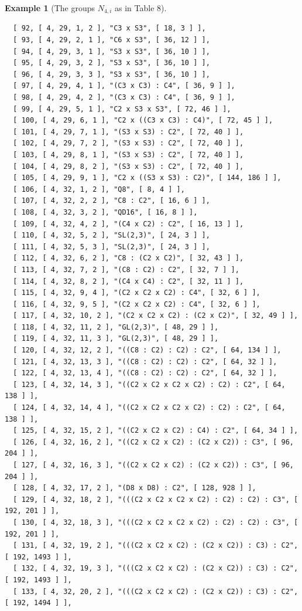 \documentclass{amsart}
\theoremstyle{plain}
\theoremstyle{definition}
\newtheorem{example}[theorem]{Example}
\theoremstyle{remark}
\begin{document}
\begin{example}[The groups $N_{4,i}$ as in Table $8$]
\begin{verbatim}
  [ 92, [ 4, 29, 1, 2 ], "C3 x S3", [ 18, 3 ] ], 
  [ 93, [ 4, 29, 2, 1 ], "C6 x S3", [ 36, 12 ] ], 
  [ 94, [ 4, 29, 3, 1 ], "S3 x S3", [ 36, 10 ] ], 
  [ 95, [ 4, 29, 3, 2 ], "S3 x S3", [ 36, 10 ] ], 
  [ 96, [ 4, 29, 3, 3 ], "S3 x S3", [ 36, 10 ] ], 
  [ 97, [ 4, 29, 4, 1 ], "(C3 x C3) : C4", [ 36, 9 ] ], 
  [ 98, [ 4, 29, 4, 2 ], "(C3 x C3) : C4", [ 36, 9 ] ], 
  [ 99, [ 4, 29, 5, 1 ], "C2 x S3 x S3", [ 72, 46 ] ], 
  [ 100, [ 4, 29, 6, 1 ], "C2 x ((C3 x C3) : C4)", [ 72, 45 ] ], 
  [ 101, [ 4, 29, 7, 1 ], "(S3 x S3) : C2", [ 72, 40 ] ], 
  [ 102, [ 4, 29, 7, 2 ], "(S3 x S3) : C2", [ 72, 40 ] ], 
  [ 103, [ 4, 29, 8, 1 ], "(S3 x S3) : C2", [ 72, 40 ] ], 
  [ 104, [ 4, 29, 8, 2 ], "(S3 x S3) : C2", [ 72, 40 ] ], 
  [ 105, [ 4, 29, 9, 1 ], "C2 x ((S3 x S3) : C2)", [ 144, 186 ] ], 
  [ 106, [ 4, 32, 1, 2 ], "Q8", [ 8, 4 ] ], 
  [ 107, [ 4, 32, 2, 2 ], "C8 : C2", [ 16, 6 ] ], 
  [ 108, [ 4, 32, 3, 2 ], "QD16", [ 16, 8 ] ], 
  [ 109, [ 4, 32, 4, 2 ], "(C4 x C2) : C2", [ 16, 13 ] ], 
  [ 110, [ 4, 32, 5, 2 ], "SL(2,3)", [ 24, 3 ] ], 
  [ 111, [ 4, 32, 5, 3 ], "SL(2,3)", [ 24, 3 ] ], 
  [ 112, [ 4, 32, 6, 2 ], "C8 : (C2 x C2)", [ 32, 43 ] ], 
  [ 113, [ 4, 32, 7, 2 ], "(C8 : C2) : C2", [ 32, 7 ] ], 
  [ 114, [ 4, 32, 8, 2 ], "(C4 x C4) : C2", [ 32, 11 ] ], 
  [ 115, [ 4, 32, 9, 4 ], "(C2 x C2 x C2) : C4", [ 32, 6 ] ], 
  [ 116, [ 4, 32, 9, 5 ], "(C2 x C2 x C2) : C4", [ 32, 6 ] ], 
  [ 117, [ 4, 32, 10, 2 ], "(C2 x C2 x C2) : (C2 x C2)", [ 32, 49 ] ], 
  [ 118, [ 4, 32, 11, 2 ], "GL(2,3)", [ 48, 29 ] ], 
  [ 119, [ 4, 32, 11, 3 ], "GL(2,3)", [ 48, 29 ] ], 
  [ 120, [ 4, 32, 12, 2 ], "((C8 : C2) : C2) : C2", [ 64, 134 ] ], 
  [ 121, [ 4, 32, 13, 3 ], "((C8 : C2) : C2) : C2", [ 64, 32 ] ], 
  [ 122, [ 4, 32, 13, 4 ], "((C8 : C2) : C2) : C2", [ 64, 32 ] ], 
  [ 123, [ 4, 32, 14, 3 ], "((C2 x C2 x C2 x C2) : C2) : C2", [ 64, 138 ] ], 
  [ 124, [ 4, 32, 14, 4 ], "((C2 x C2 x C2 x C2) : C2) : C2", [ 64, 138 ] ], 
  [ 125, [ 4, 32, 15, 2 ], "((C2 x C2 x C2) : C4) : C2", [ 64, 34 ] ], 
  [ 126, [ 4, 32, 16, 2 ], "((C2 x C2 x C2) : (C2 x C2)) : C3", [ 96, 204 ] ], 
  [ 127, [ 4, 32, 16, 3 ], "((C2 x C2 x C2) : (C2 x C2)) : C3", [ 96, 204 ] ], 
  [ 128, [ 4, 32, 17, 2 ], "(D8 x D8) : C2", [ 128, 928 ] ], 
  [ 129, [ 4, 32, 18, 2 ], "(((C2 x C2 x C2 x C2) : C2) : C2) : C3", [ 192, 201 ] ], 
  [ 130, [ 4, 32, 18, 3 ], "(((C2 x C2 x C2 x C2) : C2) : C2) : C3", [ 192, 201 ] ], 
  [ 131, [ 4, 32, 19, 2 ], "(((C2 x C2 x C2) : (C2 x C2)) : C3) : C2", [ 192, 1493 ] ], 
  [ 132, [ 4, 32, 19, 3 ], "(((C2 x C2 x C2) : (C2 x C2)) : C3) : C2", [ 192, 1493 ] ], 
  [ 133, [ 4, 32, 20, 2 ], "(((C2 x C2 x C2) : (C2 x C2)) : C3) : C2", [ 192, 1494 ] ], 

\end{verbatim}
\end{example}
\end{document}
